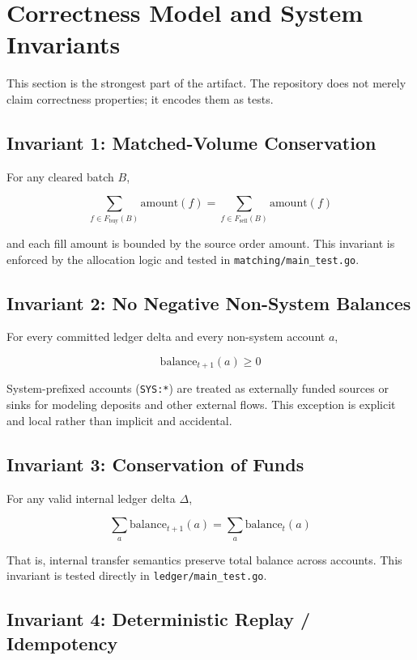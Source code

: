\documentclass[11pt]{article}
\begin{document}
\section{Correctness Model and System Invariants}

This section is the strongest part of the artifact. The repository does not merely claim correctness properties; it encodes them as tests.

\subsection{Invariant 1: Matched-Volume Conservation}

For any cleared batch \(B\),

\[
\sum_{f \in F_{\text{buy}}(B)} \mathrm{amount}(f)
=
\sum_{f \in F_{\text{sell}}(B)} \mathrm{amount}(f)
\]

and each fill amount is bounded by the source order amount. This invariant is enforced by the allocation logic and tested in \texttt{matching/main\_test.go}.

\subsection{Invariant 2: No Negative Non-System Balances}

For every committed ledger delta and every non-system account \(a\),

\[
\mathrm{balance}_{t+1}(a) \ge 0
\]

System-prefixed accounts (\texttt{SYS:*}) are treated as externally funded sources or sinks for modeling deposits and other external flows. This exception is explicit and local rather than implicit and accidental.

\subsection{Invariant 3: Conservation of Funds}

For any valid internal ledger delta \(\Delta\),

\[
\sum_a \mathrm{balance}_{t+1}(a)
=
\sum_a \mathrm{balance}_t(a)
\]

That is, internal transfer semantics preserve total balance across accounts. This invariant is tested directly in \texttt{ledger/main\_test.go}.

\subsection{Invariant 4: Deterministic Replay / Idempotency}
\end{document}
